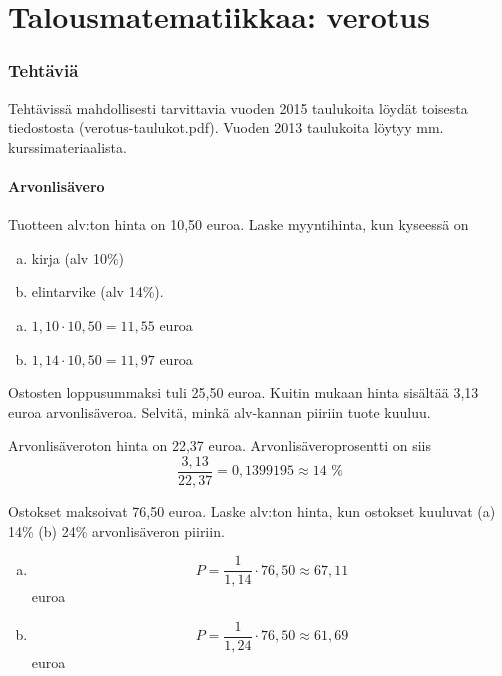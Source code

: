 \documentclass[a4paper,10pt]{article}\usepackage[]{graphicx}\usepackage[]{color}
\begin{document}
\pagestyle{empty}

\part*{Talousmatematiikkaa: verotus}
\section*{Tehtäviä}

Tehtävissä mahdollisesti tarvittavia vuoden 2015 taulukoita löydät toisesta tiedostosta (verotus-taulukot.pdf). Vuoden 2013 taulukoita löytyy mm. kurssimateriaalista.

\subsection*{Arvonlisävero}



\begin{question}
  Tuotteen alv:ton hinta on 10,50 euroa. Laske myyntihinta, kun kyseessä on
  \begin{enumerate}[(a)]
    \item kirja (alv 10\%) 
    \item elintarvike (alv 14\%).
  \end{enumerate}
\end{question}
\begin{solution}
  \begin{enumerate}[(a)] 
    \item \(1,10\cdot10,50 = 11{,}55\) euroa
    \item \(1,14\cdot10,50 = 11{,}97\) euroa
  \end{enumerate}
\end{solution}

\begin{question}
  Ostosten loppusummaksi tuli 25,50 euroa. Kuitin mukaan hinta sisältää 3,13 euroa arvonlisäveroa. Selvitä, minkä alv-kannan piiriin tuote kuuluu.
\end{question}
\begin{solution}
  Arvonlisäveroton hinta on 22{,}37 euroa. Arvonlisäveroprosentti on siis 
  \[
    \frac{3,13}{22{,}37}=0{,}1399195 \approx 14\text{~\%} 
  \]
\end{solution}

\begin{question}
  Ostokset maksoivat 76,50 euroa. Laske alv:ton hinta, kun ostokset kuuluvat (a) 14\% (b) 24\% arvonlisäveron piiriin.
\end{question}
\begin{solution}
  \begin{enumerate}[(a)]
    \item 
      \[
        P = \frac{1}{1,14}\cdot76,50\approx 67{,}11
      \]euroa
    \item 
      \[
        P = \frac{1}{1,24}\cdot76,50\approx 61{,}69
      \] euroa
  \end{enumerate}
\end{solution}
\end{document}
